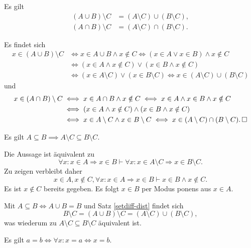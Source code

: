 \begin{Satz}\label{setdiff-dist}
Es gilt
\begin{align*}
(A\cup B)\setminus C &= (A\setminus C)\cup (B\setminus C),\\
(A\cap B)\setminus C &= (A\setminus C)\cap (B\setminus C).
\end{align*}
\end{Satz}
\begin{Beweis}
Es findet sich
\begin{align*}
x\in (A\cup B)\setminus C &\iff x\in A\cup B\land x\notin C
\iff (x\in A\lor x\in B)\land x\notin C\\
&\iff (x\in A\land x\notin C)\lor (x\in B\land x\notin C)\\
&\iff (x\in A\setminus C)\lor (x\in B\setminus C)
\iff x\in (A\setminus C)\cup (B\setminus C)
\end{align*}
und
\begin{align*}
x\in (A\cap B)\setminus C&\iff x\in A\cap B\land x\notin C
\iff x\in A\land x\in B\land x\notin C\\
&\iff (x\in A\land x\notin C)\land (x\in B\land x\notin C)\\
& \iff x\in A\setminus C\land x\in B\setminus C
\iff x\in (A\setminus C)\cap (B\setminus C).\,\square
\end{align*}
\end{Beweis}

\begin{Satz}\label{subseteq-diff}
Es gilt $A\subseteq B\implies A\setminus C\subseteq B\setminus C$.
\end{Satz}
\begin{Beweis}[Beweis 1]
Die Aussage ist äquivalent zu
\[\forall x\colon x\in A\Rightarrow x\in B\vdash \forall x\colon x\in A\setminus C\Rightarrow x\in B\setminus C.\]
Zu zeigen verbleibt daher
\[x\in A, x\notin C, \forall x\colon x\in A\Rightarrow x\in B\vdash x\in B\land x\notin C.\]
Es ist $x\notin C$ bereits gegeben. Es folgt $x\in B$ per Modus ponens aus $x\in A$.\,\qedsymbol
\end{Beweis}
\begin{Beweis}[Beweis 2]
Mit $A\subseteq B\Leftrightarrow A\cup B=B$ und Satz \ref{setdiff-dist} findet sich
\[B\setminus C = (A\cup B)\setminus C = (A\setminus C)\cup (B\setminus C),\]
was wiederum zu $A\setminus C\subseteq B\setminus C$ äquivalent ist.\,\qedsymbol
\end{Beweis}

\begin{Satz}\label{eq-iff-all-iff}
Es gilt $a=b\iff \forall x\colon x=a\Leftrightarrow x=b$.
\end{Satz}

